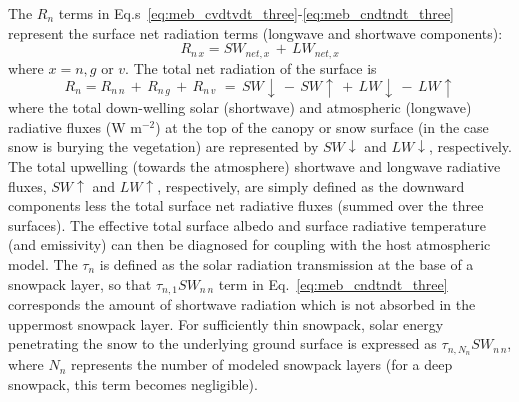 The $R_n$ terms in Eq.s~\ref{eq:meb_cvdtvdt_three}-\ref{eq:meb_cndtndt_three}
represent the surface net radiation terms (longwave and shortwave
components):
%
\begin{equation}
\label{eq:meb_net_rad}
{R}_{n\,x} = SW_{net,x} \,+\, LW_{net,x} 
%
\end{equation}
%
where $x=n,g$ or $v$.
The total net radiation of the surface is
%
\begin{equation}
\label{eq:meb_net_rad}
{R}_{n} = {R}_{n\,n} \,+\,{R}_{n\,g} \,+\,{R}_{n\,v} \,\,=\,
SW\downarrow \,-\, SW\uparrow \,+\,
LW\downarrow \,-\, LW\uparrow 
%
\end{equation}
%
where 
the total down-welling solar (shortwave) and atmospheric (longwave)
radiative fluxes (W m$^{-2}$) at the top of the canopy or snow surface (in the
case snow is burying the vegetation) 
are represented by $SW\downarrow$ and $LW\downarrow$, respectively.
The total
upwelling (towards the atmosphere) shortwave and longwave
radiative fluxes, $SW\uparrow$ and $LW\uparrow$, respectively,
are simply defined as the downward components 
less the total surface net radiative fluxes (summed over the
three surfaces). 
%
The effective total surface albedo
and surface radiative temperature (and emissivity) can then be
diagnosed 
for coupling with the
host atmospheric model.
%
The $\tau_{n}$ is defined as the solar radiation transmission at the base of a snowpack layer, so
that $\tau_{n,1} SW_{n\,n}$ term in Eq.~\ref{eq:meb_cndtndt_three} 
corresponds the amount of shortwave radiation which is not absorbed in the uppermost snowpack layer.
For sufficiently thin snowpack, solar energy penetrating the snow to
the underlying ground surface is
expressed as  $\tau_{n,N_n} SW_{n\,n}$, where $N_n$ represents the
number of modeled snowpack layers (for a deep snowpack, this term becomes negligible).


